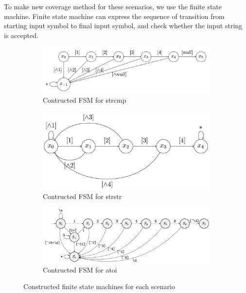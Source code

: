 \documentclass[12pt]{sigplanconf}
\begin{document}
To make new coverage method for these scenarios, we use the finite state machine. Finite state machine can express the
sequence of transition from starting input symbol to final input symbol, and check whether the input string is accepted.

\begin{figure}[h]
    \begin{subfigure}[t]{0.45\textwidth}
        \includegraphics[width=\textwidth]{figure/strcmp.png}
        \caption{Contructed FSM for strcmp}
        \label{fig:fsm-strcmp}
    \end{subfigure}
    \begin{subfigure}[t]{0.45\textwidth}
        \includegraphics[width=\textwidth]{figure/strstr.png}
        \caption{Contructed FSM for strstr}
        \label{fig:fsm-strstr}
    \end{subfigure}
    \begin{subfigure}[t]{0.45\textwidth}
        \includegraphics[width=\textwidth]{figure/atoi.png}
        \caption{Contructed FSM for atoi}
        \label{fig:fsm-atoi}
    \end{subfigure}
    \caption{Constructed finite state machines for each scenario}
    \label{fig:fsm} 
\end{figure}
\end{document}
